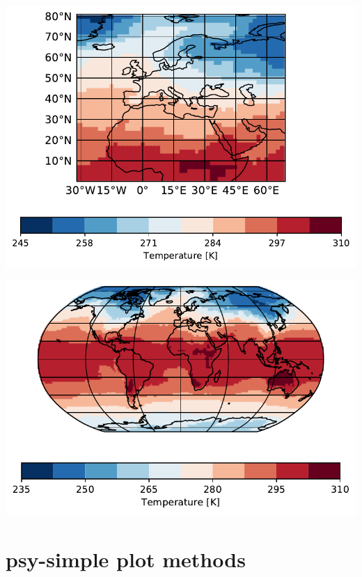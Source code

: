 \begin{refsection}
\begin{subappendices}
	\includegraphics[width=0.45\linewidth]{psyplot-figures/example-call.pdf}
	
	
	\includegraphics[width=0.6\linewidth]{psyplot-figures/example-update.pdf}
	
	\section{psy-simple plot methods}  \label{sec:psy-simple-plotmethods}
	

\end{subappendices}
\end{refsection}
